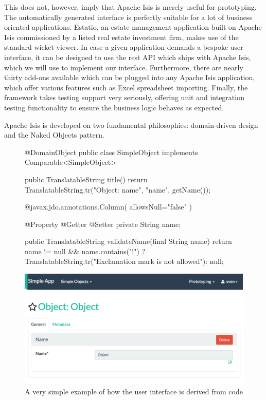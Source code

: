 This does not, however, imply that Apache Isis is merely useful for prototyping. The automatically generated interface is perfectly suitable for a lot of business oriented applications. Estatio\cite{Estat40:online}, an estate management application built on Apache Isis commissioned by a listed real estate investment firm, makes use of the standard wicket viewer. In case a given application demands a bespoke user interface, it can be designed to use the \acrshort{rest} API which ships with Apache Isis, which we will use to implement our interface. Furthermore, there are nearly thirty add-ons available which can be plugged into any Apache Isis application\cite{Apach4:online}, which offer various features such as Excel spreadsheet importing. Finally, the framework takes testing support very seriously, offering unit and integration testing functionality to ensure the business logic behaves as expected.

Apache Isis is developed on two fundamental philosophies: domain-driven design and the Naked Objects pattern.

\noindent
\begin{figure}
\begin{minipage}{.5\textwidth}
\begin{javacode}
@DomainObject
public class SimpleObject implements Comparable<SimpleObject> {
    public TranslatableString title() {
        return TranslatableString.tr("Object: {name}", "name", getName());
    }

    @javax.jdo.annotations.Column(
            allowsNull="false"
    )
    
    @Property
    @Getter @Setter
    private String name;

    public TranslatableString validateName(final String name) {
        return name != null && name.contains("!") ?
            TranslatableString.tr("Exclamation mark is not allowed"): null;
    }
}
\end{javacode}
\end{minipage}
\begin{minipage}{.5\textwidth}
	\includegraphics[width=\textwidth]{figures/simpleobjectui}
\end{minipage}
\caption{A very simple example of how the user interface is derived from code}
\end{figure}

